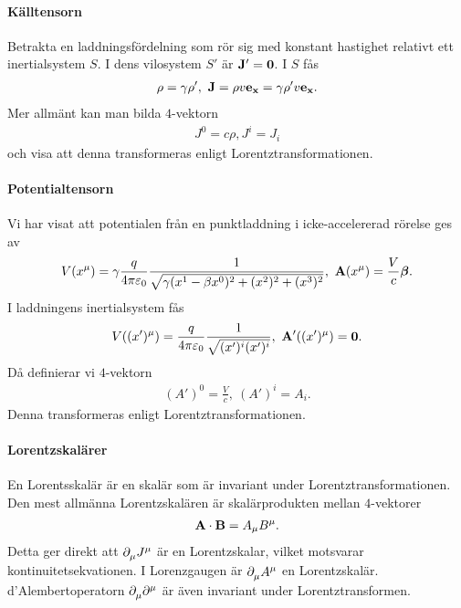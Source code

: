 \paragraph{Källtensorn}
Betrakta en laddningsfördelning som rör sig med konstant hastighet relativt ett inertialsystem $S$. I dens vilosystem $S'$ är $\vb{J}' = \vb{0}$. I $S$ fås
\begin{align*}
	\rho = \gamma \rho',\ \vb{J} = \rho v\vb{e}_{\vb{x}} = \gamma\rho' v\vb{e}_{\vb{x}}.
\end{align*}
Mer allmänt kan man bilda $4$-vektorn
\begin{align*}
	J^{0} = c\rho, J^{i} = J_{i}
\end{align*}
och visa att denna transformeras enligt Lorentztransformationen.

\paragraph{Potentialtensorn}
Vi har visat att potentialen från en punktladdning i icke-accelererad rörelse ges av
\begin{align*}
	V(x^{\mu}) = \gamma\frac{q}{4\pi\varepsilon_{0}}\frac{1}{\sqrt{\gamma(x^{1} - \beta x^{0})^{2} + (x^{2})^{2} + (x^{3})^{2}}},\ \vb{A}(x^{\mu}) = \frac{V}{c}\vb*{\beta}.
\end{align*}
I laddningens inertialsystem fås
\begin{align*}
	V((x')^{\mu}) = \frac{q}{4\pi\varepsilon_{0}}\frac{1}{\sqrt{(x')^{i}(x')^{i}}},\ \vb{A}'((x')^{\mu}) = \vb{0}.
\end{align*}
Då definierar vi $4$-vektorn
\begin{align*}
	(A')^{0} = \frac{V}{c},\ (A')^{i} = A_{i}.
\end{align*}
Denna transformeras enligt Lorentztransformationen.

\paragraph{Lorentzskalärer}
En Lorentsskalär är en skalär som är invariant under Lorentztransformationen. Den mest allmänna Lorentzskalären är skalärprodukten mellan $4$-vektorer
\begin{align*}
	\vb{A}\cdot\vb{B} = A_{\mu}B^{\mu}.
\end{align*}
Detta ger direkt att $\partial_{\mu}^{}J^{\mu}$ är en Lorentzskalar, vilket motsvarar kontinuitetsekvationen. I Lorenzgaugen är $\partial_{\mu}^{}A^{\mu}$ en Lorentzskalär. d'Alembertoperatorn $\partial_{\mu}^{}\partial^{\mu}$ är även invariant under Lorentztransformen.

